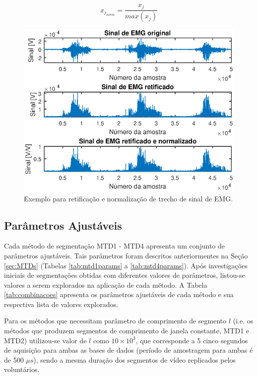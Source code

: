 \begin{equation}
	\label{eq:x_normalization}
	x_{j_{norm}} = \frac{x_j}{max(x_j)}
\end{equation}

\begin{figure}[htb]
	\caption{\label{fig:normalization}Exemplo para retificação e normalização de trecho de sinal de EMG.}
	\begin{center}
	    \includegraphics[width=0.75\linewidth]{./img/matlab/prettyRaw.eps}
	\end{center}
\end{figure}

				\subsection{Parâmetros Ajustáveis}
Cada método de segmentação MTD1 - MTD4 apresenta um conjunto de parâmetros ajustáveis. Tais parâmetros foram descritos anteriormentes na Seção \ref{sec:MTDs} (Tabelas \ref{tab:mtd1params} a \ref{tab:mtd4params}). Após investigações iniciais de segmentações obtidas com diferentes valores de parâmetros, listou-se valores a serem explorados na aplicação de cada método. A Tabela \ref{tab:combinacoes} apresenta os parâmetros ajustáveis de cada método e sua respectiva lista de valores explorados.



Para os métodos que necessitam parâmetro de comprimento de segmento $l$ (i.e. os métodos que produzem segmentos de comprimento de janela constante, MTD1 e MTD2) utilizou-se valor de $l$ como $10 \times 10^3$, que corresponde a 5 cinco segundos de aquisição para ambas as bases de dados (período de amostragem para ambas é de 500 $\mu s$), sendo a mesma duração dos segmentos de vídeo replicados pelos voluntários.


